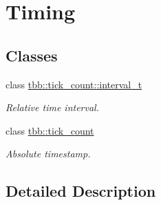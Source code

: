 \hypertarget{group__timing}{}\section{Timing}
\label{group__timing}
\subsection*{Classes}
\begin{DoxyCompactItemize}
\item 
class \hyperlink{classtbb_1_1tick__count_1_1interval__t}{tbb\+::tick\+\_\+count\+::interval\+\_\+t}
\begin{DoxyCompactList}\small\item\em Relative time interval. \end{DoxyCompactList}\item 
class \hyperlink{classtbb_1_1tick__count}{tbb\+::tick\+\_\+count}
\begin{DoxyCompactList}\small\item\em Absolute timestamp. \end{DoxyCompactList}\end{DoxyCompactItemize}


\subsection{Detailed Description}
